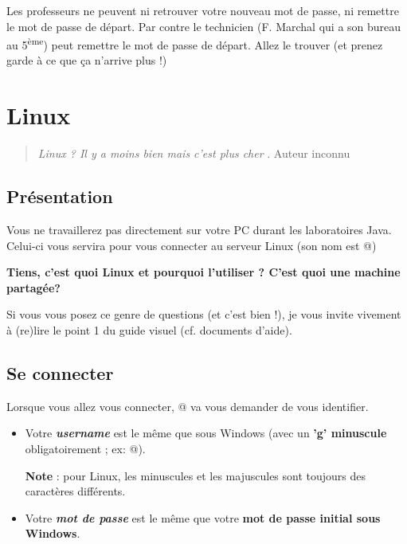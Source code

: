 \documentclass[11pt,a4paper]{article}
\begin{document}
					Les professeurs ne peuvent ni retrouver votre nouveau mot de passe, 
					ni remettre le mot de passe de d\'epart.
					Par contre le technicien 
					(F. Marchal qui a son bureau au 5\textsuperscript{\`eme}) 
					peut remettre le mot de passe de d\'epart.
					Allez le trouver (et prenez garde \`a ce que \c ca n'arrive plus !)
				
            \par
        \section{Linux}\begin{quotation}
				\guillemotleft  \textit{Linux ? Il y a moins bien mais c'est plus cher} \guillemotright .
				Auteur inconnu
			\end{quotation}\subsection{Pr\'esentation}
					Vous ne travaillerez pas directement sur votre PC durant les laboratoires Java.
					Celui-ci vous servira pour vous connecter au serveur Linux
					(son nom est @)
				
            \par
        \textbf{Tiens, c'est quoi Linux et pourquoi l'utiliser ? C'est quoi une machine partag\'ee?}
            \par
        
					Si vous vous posez ce genre de questions (et c'est bien !), 
					je vous invite vivement \`a (re)lire le point 1 du guide visuel (cf. documents d'aide).
				
            \par
        \subsection{Se connecter}
					Lorsque vous allez vous connecter, @
					va vous demander de vous identifier.
				
            \par
        
					\begin{itemize}
				
			\item 
						Votre \textbf{\textit{username}}
						est le m\^eme que sous Windows 
						(avec un \textbf{'g' minuscule} obligatoirement ; 
						ex:	@).
						\par
				\textbf{Note} : pour Linux, 
						les minuscules et les majuscules sont toujours des caract\`eres diff\'erents.
					
			\item 
						Votre \textit{\textbf{mot de passe}}
						est le m\^eme que votre \textbf{mot de passe initial sous Windows}.
					
					\end{itemize}
				
\end{document}
